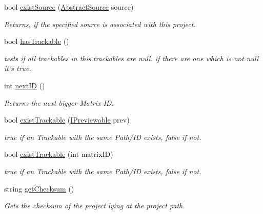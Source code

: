 \begin{DoxyCompactItemize}
bool \hyperlink{class_a_rdev_kit_1_1_model_1_1_project_1_1_project_a0efd066f58d552481f075879015e3652}{exist\-Source} (\hyperlink{class_a_rdev_kit_1_1_model_1_1_project_1_1_abstract_source}{Abstract\-Source} source)
\begin{DoxyCompactList}\small\item\em Returns, if the specified source is associated with this project. \end{DoxyCompactList}\item 
bool \hyperlink{class_a_rdev_kit_1_1_model_1_1_project_1_1_project_a97efde65dc462b98448edd6967f9e777}{has\-Trackable} ()
\begin{DoxyCompactList}\small\item\em tests if all trackables in this.\-trackables are null. if there are one which is not null it's true. \end{DoxyCompactList}\item 
int \hyperlink{class_a_rdev_kit_1_1_model_1_1_project_1_1_project_a3176ea13afc802bbb0ac63fe838823e8}{next\-I\-D} ()
\begin{DoxyCompactList}\small\item\em Returns the next bigger Matrix I\-D. \end{DoxyCompactList}\item 
bool \hyperlink{class_a_rdev_kit_1_1_model_1_1_project_1_1_project_abb0710a1f1cd83bda71a0c988e9b6d72}{exist\-Trackable} (\hyperlink{interface_a_rdev_kit_1_1_model_1_1_project_1_1_i_previewable}{I\-Previewable} prev)
\begin{DoxyCompactList}\small\item\em true if an Trackable with the same Path/\-I\-D exists, false if not. \end{DoxyCompactList}\item 
bool \hyperlink{class_a_rdev_kit_1_1_model_1_1_project_1_1_project_a4bdc5fa718a8a54711dd659d8edc1ea0}{exist\-Trackable} (int matrix\-I\-D)
\begin{DoxyCompactList}\small\item\em true if an Trackable with the same Path/\-I\-D exists, false if not. \end{DoxyCompactList}\item 
string \hyperlink{class_a_rdev_kit_1_1_model_1_1_project_1_1_project_a222ab9abcfa20e2637300bbc94a8f3c2}{get\-Checksum} ()
\begin{DoxyCompactList}\small\item\em Gets the checksum of the project lying at the project path. \end{DoxyCompactList}\end{DoxyCompactItemize}
